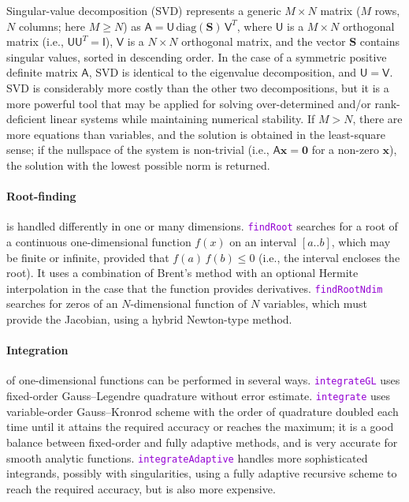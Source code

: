 \documentclass[12pt]{article}
\newcommand{\ttt}[1]{\textcolor{darkviolet}{\texttt{#1}}}
\newcommand{\bx}{\boldsymbol{x}}
\begin{document}
Singular-value decomposition (SVD) represents a generic $M\times N$ matrix ($M$ rows, $N$ columns; here $M\ge N$) as $\mathsf{A}=\mathsf{U}\,\mathrm{diag}(\boldsymbol{S})\,\mathsf{V}^T$, where $\mathsf{U}$ is a $M\times N$ orthogonal matrix (i.e., $\mathsf{U}\mathsf{U}^T=\mathsf{I}$), $\mathsf{V}$ is a $N\times N$ orthogonal matrix, and the vector $\boldsymbol{S}$ contains singular values, sorted in descending order. In the case of a symmetric positive definite matrix $\mathsf{A}$, SVD is identical to the eigenvalue decomposition, and $\mathsf{U}=\mathsf{V}$.
SVD is considerably more costly than the other two decompositions, but it is a more powerful tool that may be applied for solving over-determined and/or rank-deficient linear systems while maintaining numerical stability.
If $M>N$, there are more equations than variables, and the solution is obtained in the least-square sense; if the nullspace of the system is non-trivial (i.e., $\mathsf{A}\bx=\boldsymbol{0}$ for a non-zero $\bx$), the solution with the lowest possible norm is returned.

\paragraph{Root-finding}  is handled differently in one or many dimensions.
\ttt{findRoot} searches for a root of a continuous one-dimensional function $f(x)$ on an interval $[a..b]$, which may be finite or infinite, provided that $f(a)\,f(b) \le 0$ (i.e., the interval encloses the root). It uses a combination of Brent's method with an optional Hermite interpolation in the case that the function provides derivatives.
\ttt{findRootNdim} searches for zeros of an $N$-dimensional function of $N$ variables, which must provide the Jacobian, using a hybrid Newton-type method.

\paragraph{Integration}  of one-dimensional functions can be performed in several ways. \ttt{integrateGL} uses fixed-order Gauss--Legendre quadrature without error estimate. \ttt{integrate} uses variable-order Gauss--Kronrod scheme with the order of quadrature doubled each time until it attains the required accuracy or reaches the maximum; it is a good balance between fixed-order and fully adaptive methods, and is very accurate for smooth analytic functions. \ttt{integrateAdaptive} handles more sophisticated integrands, possibly with singularities, using a fully adaptive recursive scheme to reach the required accuracy, but is also more expensive.
\end{document}
